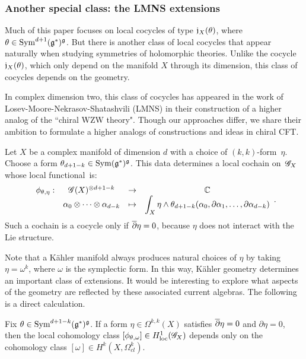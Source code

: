 \subsubsection{Another special class: the LMNS extensions}
\label{sec: nekext}

Much of this paper focuses on local cocycles of type $\mathfrak j_X(\theta)$, where $\theta \in {\rm Sym}^{d+1}(\mathfrak g^*)^\mathfrak g$.
But there is another class of local cocycles that appear naturally when studying symmetries of holomorphic theories. 
Unlike the cocycle $\mathfrak j_X(\theta)$, which only depend on the manifold $X$ through its dimension, 
this class of cocycles depends on the geometry.

In complex dimension two, this class of cocycles has appeared in the work of Losev-Moore-Nekrasov-Shatashvili (LMNS) \cite{LMNS1,LMNS2,LMNS3} in their construction of a higher analog of the ``chiral WZW theory". 
Though our approaches differ, we share their ambition to formulate a higher analogs of constructions and ideas in chiral CFT. 

Let $X$ be a complex manifold of dimension $d$ with a choice of $(k,k)$-form~$\eta$. 
Choose a form $\theta_{d+1-k} \in {\rm Sym}(\mathfrak g^*)^\mathfrak g$.
This data determines a local cochain on~$\mathscr G_X$ whose local functional~is:
\[
\begin{array}{cccc}
\displaystyle \phi_{\theta, \eta} : & \mathscr G(X)^{\otimes d + 1 - k} & \to & \mathbb C \\
\displaystyle & \alpha_0 \otimes\cdots \otimes \alpha_{d-k} & \mapsto & \displaystyle \int_X \eta \wedge \theta_{d+1-k}(\alpha_0, \partial\alpha_1,\ldots,\partial \alpha_{d-k})
\end{array}.
\]
Such a cochain is a cocycle only if $\overline{\partial} \eta = 0$, because $\eta$ does not interact with the Lie structure.

Note that a K\"{a}hler manifold always produces natural choices of $\eta$ by taking $\eta = \omega^{k}$, where $\omega$ is the symplectic form.
In this way, K\"{a}hler geometry determines an important class of extensions.
It would be interesting to explore what aspects of the geometry are reflected by these associated current algebras.
The following is a direct calculation.

\begin{lem}\label{lem: cocycle KM}
Fix $\theta \in {\rm Sym}^{d+1-k}(\mathfrak g^*)^\mathfrak g$.
If a form $\eta \in \Omega^{k,k}(X)$ satisfies $\overline{\partial} \eta = 0$ and $\partial \eta = 0$,
then the local cohomology class $[\phi_{\theta,\omega}] \in H^1_{\rm loc}(\mathscr G_X)$  depends only on the cohomology class $[\omega] \in H^{k}(X , \Omega^k_{cl})$.
\end{lem}

